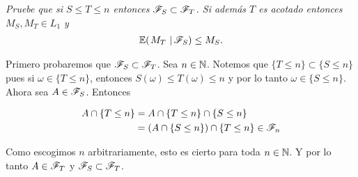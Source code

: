 \emph{
	Pruebe que si ${S\leq T\leq n}$ entonces ${\mathscr{F}_S\subset\mathscr{F}_T}$. Si adem\'as ${T}$ es acotado entonces ${M_S,M_T \in L_1}$ y 
	\begin{align}
		\espc{M_T}{\F_S}\leq M_S.
	\end{align}	
}

	Primero probaremos que ${\mathscr{F}_S \subset \mathscr{F}_T}$. Sea $n \in \mathbb{N}$. Notemos que $\{ T \leq n \} \subset \{ S \leq n \}$ pues
	si ${\omega \in \{ T \leq n \}}$, entonces ${S(\omega) \leq T(\omega) \leq n }$ y por lo tanto ${\omega \in \{ S \leq n \}}$.\\

	Ahora sea ${A \in \mathscr{F}_S}$. Entonces

	\begin{align}
		A \cap \{ T \leq n \} 	&=		A  \cap \{ T \leq n \} \cap \{ S \leq n \} \\
								&=		(A  \cap \{ S \leq n \}) \cap \{ T \leq n \} \in \mathscr{F}_n
	\end{align}

	Como escogimos $n$ arbitrariamente, esto es cierto para toda $n \in \mathbb{N}$. Y por lo tanto $A \in \mathscr{F}_T$ y $\mathscr{F}_S \subset \mathscr{F}_T$.\\
